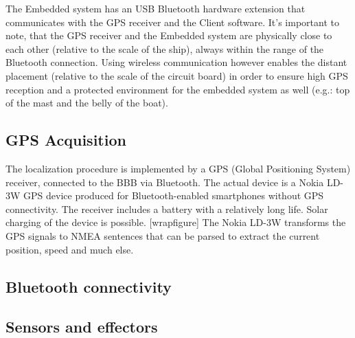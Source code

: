The Embedded system has an USB Bluetooth hardware extension that communicates with the GPS receiver and the Client software.
It’s important to note, that the GPS receiver and the Embedded system are physically close to each other (relative to the scale of the ship), always within the range of the Bluetooth connection. Using wireless communication however enables the distant placement (relative to the scale of the circuit board) in order to ensure high GPS reception and a protected environment for the embedded system as well (e.g.: top of the mast and the belly of the boat).

\subsection{GPS Acquisition}

The localization procedure is implemented by a GPS (Global Positioning System) receiver, connected to the BBB via Bluetooth. The actual device is a Nokia LD-3W GPS device produced for Bluetooth-enabled smartphones without GPS connectivity. The receiver includes a battery with a relatively long life. Solar charging of the device is possible. [wrapfigure]
The Nokia LD-3W transforms the GPS signals to NMEA sentences that can be parsed to extract the current position, speed and much else.

\subsection{Bluetooth connectivity}

\subsection{Sensors and effectors}